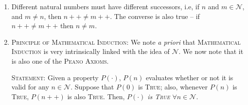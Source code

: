 \documentclass[multi, tikz, 11pt]{article}
\begin{document}
\begin{enumerate}
\item Different natural numbers must have different successors, i.e, if $n$ and $m \in \mathcal{N}$, and $m \neq n$, then $n++ \neq m++$. {\color{red}The converse is also true -- if $n++ \neq m++$ then $n \neq m$.}

\item {\textsc{\color{red}Principle of Mathematical Induction}}: We note \textit{a priori} that \textsc{Mathematical Induction} is very intrinsically linked with the idea of $\mathcal{N}$. We now note that it is also one of the \textsc{Peano Axioms}.

\noindent\textsc{Statement:} Given a property $P(\cdot)$, $P(n)$ evaluates whether or not it is valid for any $n \in \mathcal{N}$. Suppose that $P(0)$ is \textsc{True}; also, whenever $P(n)$ is \textsc{True}, $P(n++)$ is also \textsc{True}. Then, {\color{red} $P(\cdot)$ \textit{is \textsc{True} $\forall n \in \mathcal{N}$}}.

\end{enumerate}
\noindent{}
\end{document}
